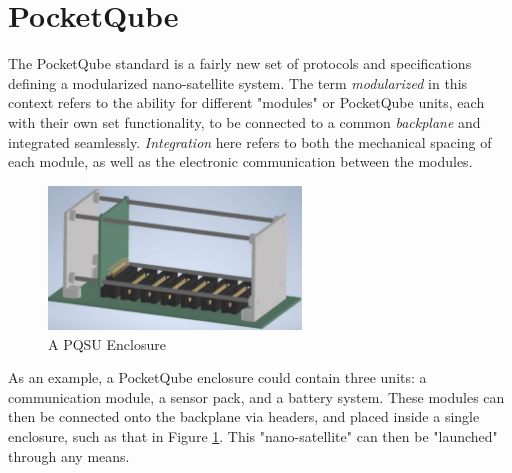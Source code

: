 \graphicspath{{./figures}}

\section{PocketQube}

The PocketQube standard is a fairly new set of protocols and specifications defining a modularized nano-satellite system. The term \textit{modularized} in this context refers to the ability for different "modules" or PocketQube units, each with their own set functionality, to be connected to a common \textit{backplane} and integrated seamlessly. \textit{Integration} here refers to both the mechanical spacing of each module, as well as the electronic communication between the modules.

\begin{figure}[!htb]
    \centering
    \includegraphics[width=0.6\textwidth]{pq_enclosure}
    \caption{A PQSU Enclosure \cite{standard-pqsu}}
    \label{fig:pq_enclosure}
\end{figure}

As an example, a PocketQube enclosure could contain three units: a communication module, a sensor pack, and a battery system. These modules can then be connected onto the backplane via headers, and placed inside a single enclosure, such as that in Figure \ref{fig:pq_enclosure}. This "nano-satellite" can then be "launched" through any means.